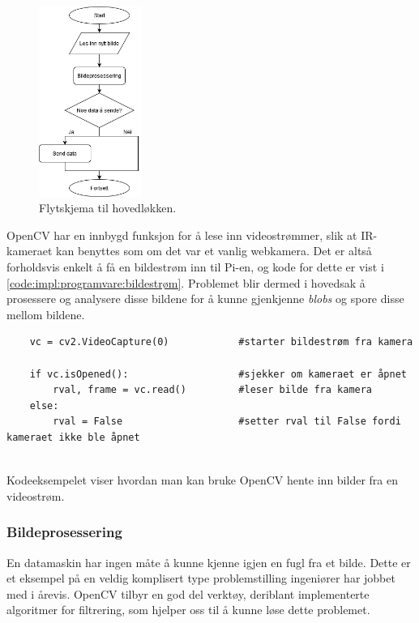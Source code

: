 \begin{figure}[H]
    \centering
    \includegraphics[width=0.3\textwidth]{implementering/Program/main_loop.png}
    \caption{Flytskjema til hovedløkken.}
    \label{fig:hovedprogram_loop}
\end{figure}

OpenCV har en innbygd funksjon for å lese inn videostrømmer, slik at IR-kameraet kan benyttes som om det var et vanlig webkamera. 
Det er altså forholdsvis enkelt å få en bildestrøm inn til Pi-en, og kode for dette er vist i \autoref{code:impl:programvare:bildestrøm}. 
Problemet blir dermed i hovedsak å prosessere og analysere disse bildene for å kunne gjenkjenne \textit{blobs} og spore disse mellom bildene.

\begin{listing}[!htb]
\begin{verbatim}
    vc = cv2.VideoCapture(0)            #starter bildestrøm fra kamera
    
    if vc.isOpened():                   #sjekker om kameraet er åpnet
        rval, frame = vc.read()         #leser bilde fra kamera
    else:
        rval = False                    #setter rval til False fordi kameraet ikke ble åpnet
    
\end{verbatim}
\caption{Kodeeksempelet viser hvordan man kan bruke OpenCV hente inn bilder fra en videostrøm.}
\label{code:impl:programvare:bildestrøm}
\end{listing}


\subsubsection{Bildeprosessering}\label{sec:impl:programvare:bildepro}

En datamaskin har ingen måte å kunne kjenne igjen en fugl fra et bilde. 
Dette er et eksempel på en veldig komplisert type problemstilling ingeniører har jobbet med i årevis. 
OpenCV tilbyr en god del verktøy, deriblant implementerte algoritmer for filtrering, som hjelper oss til å kunne løse dette problemet. 

